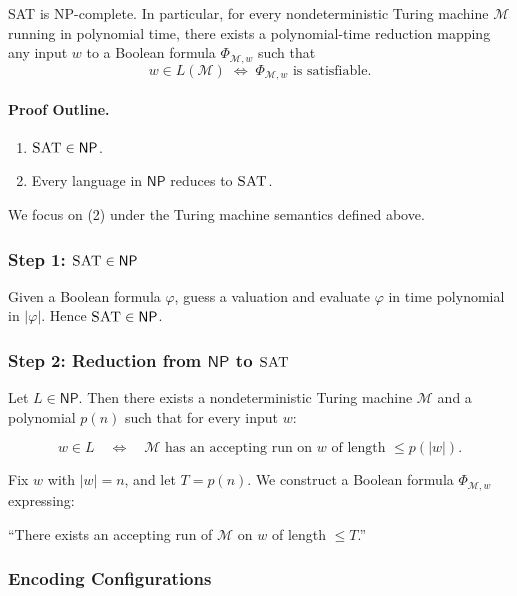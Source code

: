 \documentclass{article}
\newtheorem{theorem}{Theorem}[section]
\let\oldtheorem\theorem
\let\endoldtheorem\endtheorem
\renewenvironment{theorem}
  {\begin{tcolorbox}[
      colback=yellow!6,
      colframe=yellow!60!black,
      boxrule=0.6pt,
      arc=2pt,
      left=6pt,right=6pt,top=4pt,bottom=4pt,
      parbox=false
    ]\oldtheorem}
  {\endoldtheorem\end{tcolorbox}}
\begin{document}
\begin{theorem}[Cook--Levin]
\textsc{SAT} is NP-complete. In particular, for every nondeterministic Turing
machine $\mathcal{M}$ running in polynomial time, there exists a polynomial-time
reduction mapping any input $w$ to a Boolean formula $\Phi_{\mathcal{M},w}$
such that
\[
w \in L(\mathcal{M})
\;\Longleftrightarrow\;
\Phi_{\mathcal{M},w} \text{ is satisfiable.}
\]
\end{theorem}

\paragraph{Proof Outline.}
\begin{enumerate}
    \item $\textsc{SAT} \in \textsf{NP}$.
    \item Every language in $\textsf{NP}$ reduces to $\textsc{SAT}$.
\end{enumerate}

We focus on (2) under the Turing machine semantics defined above.

\subsubsection*{Step 1: $\textsc{SAT} \in \textsf{NP}$}

Given a Boolean formula $\varphi$, guess a valuation and evaluate $\varphi$
in time polynomial in $|\varphi|$. Hence $\textsc{SAT} \in \textsf{NP}$.

\subsubsection*{Step 2: Reduction from $\textsf{NP}$ to $\textsc{SAT}$}

Let $L \in \textsf{NP}$. Then there exists a nondeterministic Turing machine
$\mathcal{M}$ and a polynomial $p(n)$ such that for every input $w$:

\[
w \in L
\quad \Longleftrightarrow \quad
\mathcal{M} \text{ has an accepting run on } w
\text{ of length } \le p(|w|).
\]

Fix $w$ with $|w|=n$, and let $T = p(n)$.
We construct a Boolean formula $\Phi_{\mathcal{M},w}$ expressing:

\begin{center}
``There exists an accepting run of $\mathcal{M}$ on $w$
of length $\le T$.'' 
\end{center}

\subsubsection*{Encoding Configurations}
\end{document}
